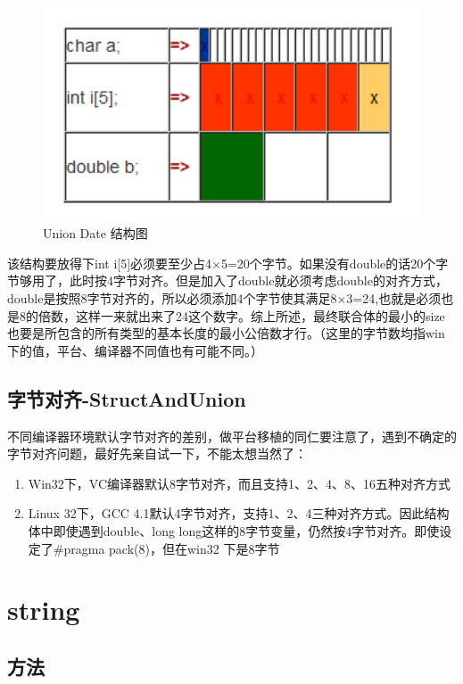 \documentclass[UTF8,a4paper,12pt]{ctexbook} %
\begin{document}
	        \begin{figure}[H]
	        	\centering
	        	\includegraphics[width = 12cm]{union2.png}
	        	\caption{Union Date 结构图}
	        \end{figure}
	        
	        该结构要放得下int i[5]必须要至少占4×5=20个字节。如果没有double的话20个字节够用了，此时按4字节对齐。但是加入了double就必须考虑double的对齐方式，double是按照8字节对齐的，所以必须添加4个字节使其满足8×3=24,也就是必须也是8的倍数，这样一来就出来了24这个数字。综上所述，最终联合体的最小的size也要是所包含的所有类型的基本长度的最小公倍数才行。（这里的字节数均指win 下的值，平台、编译器不同值也有可能不同。）
	\section{字节对齐-StructAndUnion}
		不同编译器环境默认字节对齐的差别，做平台移植的同仁要注意了，遇到不确定的字节对齐问题，最好先亲自试一下，不能太想当然了：
		\begin{enumerate}
			\item Win32下，VC编译器默认8字节对齐，而且支持1、2、4、8、16五种对齐方式
			\item Linux 32下，GCC 4.1默认4字节对齐，支持1、2、4三种对齐方式。因此结构体中即使遇到double、long long这样的8字节变量，仍然按4字节对齐。即使设定了\#pragma pack(8)，但在win32 下是8字节
		\end{enumerate}	        
         
\chapter{string} 
	\section{方法}
\end{document}
